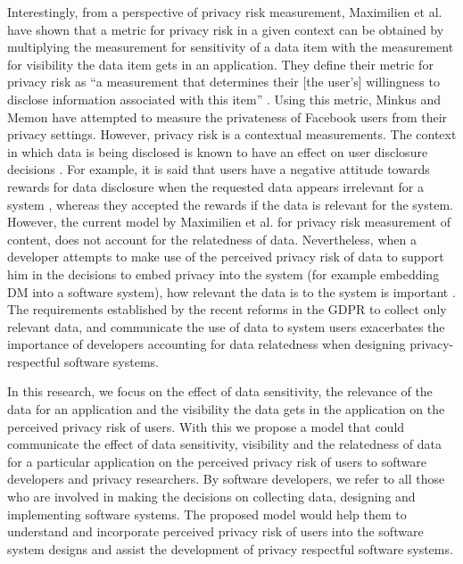 \documentclass[10pt]{article}
\begin{document}
Interestingly, from a perspective of privacy risk measurement, Maximilien et al. \cite {maximilien2009privacy} have shown that a metric for privacy risk in a given context can be obtained by multiplying the measurement for sensitivity of a data item with the measurement for visibility the data item gets in an application. They define their metric for privacy risk as \enquote{a measurement that determines their [the user's] willingness to disclose information associated with this item} \cite {maximilien2009privacy}. Using this metric, Minkus and Memon \cite{minkus2014scale} have attempted to measure the privateness of Facebook users from their privacy settings. However, privacy risk is a contextual measurements. The context in which data is being disclosed \cite {nissenbaum2009privacy, john2010strangers} is known to have an effect on user disclosure decisions \cite {knijnenburg2013making, malheiros2013fairly}. For example, it is said that users have a negative attitude towards rewards for data disclosure when the requested data appears irrelevant for a system \cite {li2010understanding}, whereas they accepted the rewards if the data is relevant for the system. However, the current model by Maximilien et al. \cite {maximilien2009privacy} for privacy risk measurement of content, does not account for the relatedness of data. Nevertheless, when a developer attempts to make use of the perceived privacy risk of data to support him in the decisions to embed privacy into the system (for example embedding DM into a software system), how relevant the data is to the system is important \cite {senarath2018under}. The requirements established by the recent reforms in the GDPR to collect only relevant data, and communicate the use of data to system users \cite {wagner2016national} exacerbates the importance of developers accounting for data relatedness when designing privacy-respectful software systems.

In this research, we focus on the effect of data sensitivity, the relevance of the data for an application and the visibility the data gets in the application on the perceived privacy risk of users. With this we propose a model that could communicate the effect of data sensitivity, visibility and the relatedness of data for a particular application on the perceived privacy risk of users to software developers and privacy researchers. By software developers, we refer to all those who are involved in making the decisions on collecting data, designing and implementing software systems. The proposed model would help them to understand and incorporate perceived privacy risk of users into the software system designs and assist the development of privacy respectful software systems. 
\end{document}
